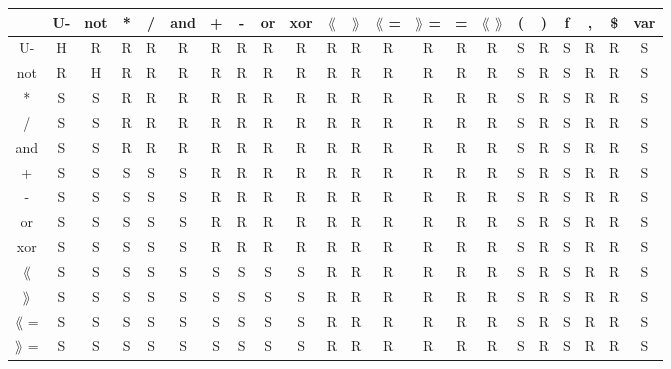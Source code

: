 \newcommand{\la}{\langle}
\newcommand{\ra}{\rangle}
\begin{table}[h]
\begin{tabular}{c|ccccccccccccccccccccc}
                & U- \footnotemark[1] & not & * & / & and & + & - & or & xor & $\lang$ & $\rang$ & $\lang$ = & $\rang$ = & = & $\lang$ $\rang$ & ( & ) & f & , & \$ & var \\ \hline
U- \footnotemark[1]  & H  &  R  & R & R &  R  & R & R & R  &  R  &   R     &    R    & R  & R  & R & R  & S & R & S & R & R  & S   \\ %
not             & R  &  H  & R & R &  R  & R & R & R  &  R  &   R     &    R    & R  & R  & R & R  & S & R & S & R & R  & S   \\ %
*               & S  &  S  & R & R &  R  & R & R & R  &  R  &   R     &    R    & R  & R  & R & R  & S & R & S & R & R  & S   \\ %
/               & S  &  S  & R & R &  R  & R & R & R  &  R  &   R     &    R    & R  & R  & R & R  & S & R & S & R & R  & S   \\ %
and             & S  &  S  & R & R &  R  & R & R & R  &  R  &   R     &    R    & R  & R  & R & R  & S & R & S & R & R  & S   \\ %
+               & S  &  S  & S & S &  S  & R & R & R  &  R  &   R     &    R    & R  & R  & R & R  & S & R & S & R & R  & S   \\ %
-               & S  &  S  & S & S &  S  & R & R & R  &  R  &   R     &    R    & R  & R  & R & R  & S & R & S & R & R  & S   \\ %
or              & S  &  S  & S & S &  S  & R & R & R  &  R  &   R     &    R    & R  & R  & R & R  & S & R & S & R & R  & S   \\ %
xor             & S  &  S  & S & S &  S  & R & R & R  &  R  &   R     &    R    & R  & R  & R & R  & S & R & S & R & R  & S   \\ %
$\lang$         & S  &  S  & S & S &  S  & S & S & S  &  S  &   R     &    R    & R  & R  & R & R  & S & R & S & R & R  & S   \\ %
$\rang$         & S  &  S  & S & S &  S  & S & S & S  &  S  &   R     &    R    & R  & R  & R & R  & S & R & S & R & R  & S   \\ %
$\lang$ =       & S  &  S  & S & S &  S  & S & S & S  &  S  &   R     &    R    & R  & R  & R & R  & S & R & S & R & R  & S   \\ %
$\rang$ =       & S  &  S  & S & S &  S  & S & S & S  &  S  &   R     &    R    & R  & R  & R & R  & S & R & S & R & R  & S   \\ %

\end{tabular}
\end{table}

